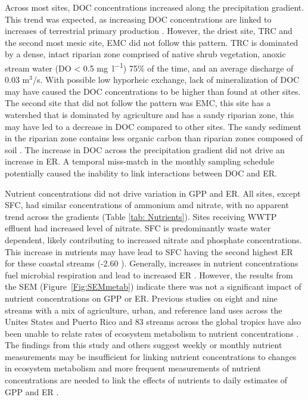 Across most sites, DOC concentrations increased along the precipitation gradient. This trend was expected, as increasing DOC concentrations are linked to increases of terrestrial primary production \cite{meybeckCarbonNitrogenPhosphorus1982, mulhollandGroupReportWhat1989, jonesLongtermPerspectiveDissolved1996}. However, the driest site, TRC and the second most mesic site, EMC did not follow this pattern. TRC is dominated by a dense, intact riparian zone comprised of native shrub vegetation, anoxic stream water (DO < 0.5 \unit{\mg\per\l}) 75\% of the time, and an average discharge of 0.03 m$^3$/s. With possible low hyporheic exchange, lack of mineralization of DOC may have caused the DOC concentrations to be higher than found at other sites. The second site that did not follow the pattern was EMC, this site has a watershed that is dominated by agriculture and has a sandy riparian zone, this may have led to a decrease in DOC compared to other sites. The sandy sediment in the riparian zone contains less organic carbon than riparian zones composed of soil \cite{boix-fayosSedimentFlowPaths2015}. The increase in DOC across the precipitation gradient did not drive an increase in ER. A temporal miss-match in the monthly sampling schedule potentially caused the inability to link interactions between DOC and ER.


Nutrient concentrations did not drive variation in GPP and ER. All sites, except SFC, had similar concentrations of ammonium amd nitrate, with  no apparent trend across the gradients (Table \ref{tab: Nutrients}). Sites receiving WWTP effluent had increased level of nitrate. SFC is predominantly waste water dependent, likely contributing to increased nitrate and phosphate concentrations. This increase in nutrients may have lead to SFC having the second highest ER for these coastal streams (-2.60 \unit{\goxy}). Generally, increases in nutrient concentrations fuel microbial respiration and lead to increased ER \cite{ramirezEffectsStreamPhosphorus2003}. However, the results from the SEM (Figure~\ref{Fig:SEMmetab}) indicate there was not a significant impact of nutrient concentrations on GPP or ER. Previous studies on eight and nine streams with a mix of agriculture, urban, and reference land uses across the Unites States and Puerto Rico and 83 streams across the global tropics have also been unable to relate rates of ecosystem metabolism to nutrient concentrations \cite{mulholland_inter-biome_2001,bernot_inter-regional_2010, marzolfEcosystemMetabolismTropical2021}. The findings from this study and others suggest weekly or monthly nutrient measurements may be insufficient for linking nutrient concentrations to changes in ecosystem metabolism and more frequent measurements of nutrient concentrations are needed to link the effects of nutrients to daily estimates of GPP and ER \cite{bernot_inter-regional_2010, fus_land_2017}.


